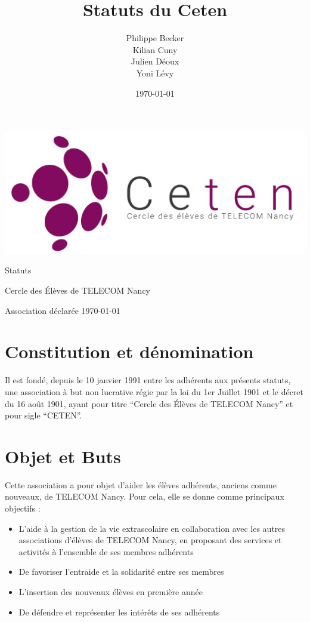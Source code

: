 \documentclass{article} %
\title{Statuts du Ceten}
\author{Philippe Becker\\
	Kilian Cuny\\
	Julien Déoux\\
	Yoni Lévy}
\date\today
\begin{document}

	
	\begin{titlepage}
		\begin{center}
			\includegraphics[width=\textwidth]{images/ceten.png}\par
			\vspace{3cm}
			{\Huge \light Statuts}\par
			\vfill
			{\large Cercle des Élèves de TELECOM Nancy}\par
			{\large \light Association déclarée}
			\vfill
			{\light \today}\par
		\end{center}
	\end{titlepage}

	



	\section{Constitution et dénomination}
		Il est fondé, depuis le 10 janvier 1991 entre les adhérents aux présents
		statuts, une association à but non lucrative régie par la loi du 1er Juillet
		1901 et le décret du 16 août 1901, ayant pour titre “Cercle des Élèves de
		TELECOM Nancy” et pour sigle “CETEN”.

	\section{Objet et Buts}
	\label{sec:objet}
		Cette association a pour objet d’aider les élèves adhérents, anciens comme
		nouveaux, de TELECOM Nancy. Pour cela, elle se donne comme principaux
		objectifs :
		\begin{itemize}
			\item L’aide à la gestion de la vie extrascolaire en collaboration avec
			    les autres associations d'élèves de TELECOM Nancy, en proposant des
			    services et activités à l’ensemble de ses membres adhérents
			\item De favoriser l’entraide et la solidarité entre ses membres
			\item L’insertion des nouveaux élèves en première année
			\item De défendre et représenter les intérêts de ses adhérents
		\end{itemize}
\end{document}
